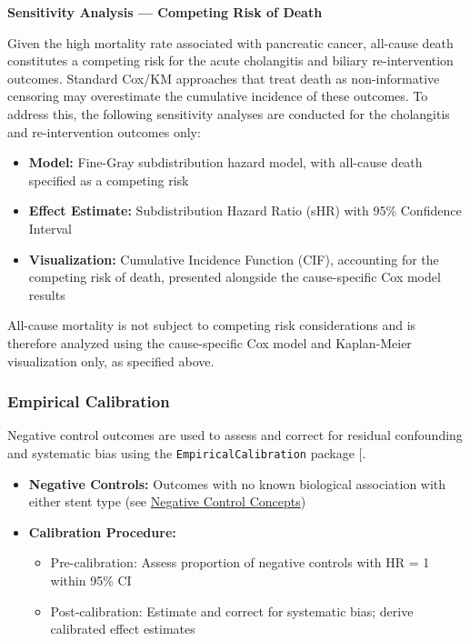 \documentclass[
  12pt,
]{article}
\providecommand{\tightlist}{%
  \setlength{\itemsep}{0pt}\setlength{\parskip}{0pt}}
\begin{document}
\textbf{Sensitivity Analysis --- Competing Risk of Death}

Given the high mortality rate associated with pancreatic cancer, all-cause death constitutes a competing risk for the acute cholangitis and biliary re-intervention outcomes. Standard Cox/KM approaches that treat death as non-informative censoring may overestimate the cumulative incidence of these outcomes. To address this, the following sensitivity analyses are conducted for the cholangitis and re-intervention outcomes only:

\begin{itemize}
\tightlist
\item
  \textbf{Model:} Fine-Gray subdistribution hazard model, with all-cause death specified as a competing risk
\item
  \textbf{Effect Estimate:} Subdistribution Hazard Ratio (sHR) with 95\% Confidence Interval
\item
  \textbf{Visualization:} Cumulative Incidence Function (CIF), accounting for the competing risk of death, presented alongside the cause-specific Cox model results
\end{itemize}

All-cause mortality is not subject to competing risk considerations and is
therefore analyzed using the cause-specific Cox model and Kaplan-Meier
visualization only, as specified above.

\subsubsection{Empirical Calibration}\label{empirical-calibration}

Negative control outcomes are used to assess and correct for residual confounding and systematic bias using the \texttt{EmpiricalCalibration} package {[}\citeproc{ref-Schuemie2018-pnas}{6}{]}.

\begin{itemize}
\tightlist
\item
  \textbf{Negative Controls:} Outcomes with no known biological association with either stent type (see \hyperref[negative-control-concepts]{Negative Control Concepts})
\item
  \textbf{Calibration Procedure:}

  \begin{itemize}
  \tightlist
  \item
    Pre-calibration: Assess proportion of negative controls with HR = 1 within 95\% CI
  \item
    Post-calibration: Estimate and correct for systematic bias; derive calibrated effect estimates
  \end{itemize}
\end{itemize}
\end{document}
